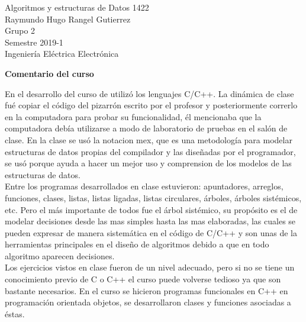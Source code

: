 \documentclass[10pt]{letter} %
\begin{document}


\begin{letter}{Algoritmos y estructuras de Datos 1422 \\
		Raymundo Hugo Rangel Gutierrez \\ Grupo 2 \\ Semestre 2019-1 \\ Ingeniería Eléctrica Electrónica  } %


\opening{\textbf{Comentario del curso}}



En el desarrollo del curso de utilizó los lenguajes C/C++. La dinámica de clase fué copiar el código del pizarrón escrito por el profesor y posteriormente correrlo en la computadora para probar su funcionalidad, él mencionaba que la computadora debía utilizarse a modo de laboratorio de pruebas en el salón de clase. En la clase se usó la notacion mex, que es una metodología para modelar estructuras de datos propias del compilador y las diseñadas por el programador, se usó porque ayuda a hacer un mejor uso y comprension de los modelos de las estructuras de datos.\\

Entre los programas desarrollados en clase estuvieron: apuntadores, arreglos, funciones, clases, listas, listas ligadas, listas circulares, árboles, árboles sistémicos, etc. Pero el más importante de todos fue el árbol sistémico, su propósito es el de modelar decisiones desde las mas simples hasta las mas elaboradas, las cuales se pueden expresar de manera sistemática en el código de C/C++ y son unas de la herramientas principales en el diseño de algoritmos debido a que en todo algoritmo aparecen decisiones.\\

Los ejercicios vistos en clase fueron de un nivel adecuado, pero si no se tiene un conocimiento previo de C o C++ el curso puede volverse tedioso ya que son bastante necesarios. En el curso se hicieron programas funcionales en C++ en programación orientada objetos, se desarrollaron clases y funciones asociadas a éstas.\\


\end{letter}
\end{document}
